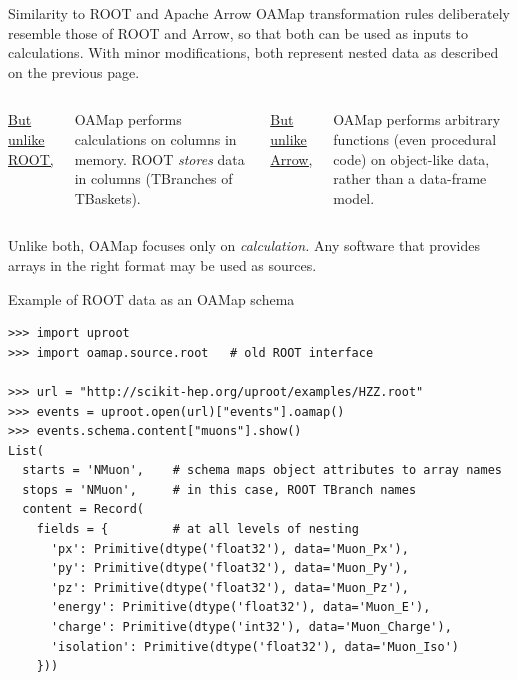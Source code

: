 \documentclass[aspectratio=169]{beamer}
\begin{document}
\begin{frame}{Similarity to ROOT and Apache Arrow}
\vspace{0.5 cm}
OAMap transformation rules deliberately resemble those of ROOT and Arrow, so that both can be used as inputs to calculations. With minor modifications, both represent nested data as described on the previous page.

\vspace{-0.2 cm}
\begin{columns}[t]
\begin{center}
\large \underline{But unlike ROOT,}\mbox{\hspace{0.5 cm}}
\end{center}

OAMap performs calculations on columns in memory. ROOT {\it stores} data in columns (TBranches of TBaskets).

\begin{center}
\large \underline{But unlike Arrow,}\mbox{\hspace{0.5 cm}}
\end{center}

OAMap performs arbitrary functions (even procedural code) on object-like data, rather than a data-frame model.
\end{columns}

\vspace{0.7 cm}
Unlike both, OAMap focuses only on {\it calculation.} Any software that provides arrays in the right format may be used as sources.
\end{frame}

\begin{frame}[fragile]{Example of ROOT data as an OAMap schema}
\small
\begin{verbatim}
>>> import uproot
>>> import oamap.source.root   # old ROOT interface

>>> url = "http://scikit-hep.org/uproot/examples/HZZ.root"
>>> events = uproot.open(url)["events"].oamap()
>>> events.schema.content["muons"].show()
List(
  starts = 'NMuon',    # schema maps object attributes to array names
  stops = 'NMuon',     # in this case, ROOT TBranch names
  content = Record(
    fields = {         # at all levels of nesting
      'px': Primitive(dtype('float32'), data='Muon_Px'),
      'py': Primitive(dtype('float32'), data='Muon_Py'),
      'pz': Primitive(dtype('float32'), data='Muon_Pz'),
      'energy': Primitive(dtype('float32'), data='Muon_E'),
      'charge': Primitive(dtype('int32'), data='Muon_Charge'),
      'isolation': Primitive(dtype('float32'), data='Muon_Iso')
    }))
\end{verbatim}
\end{frame}
\end{document}
